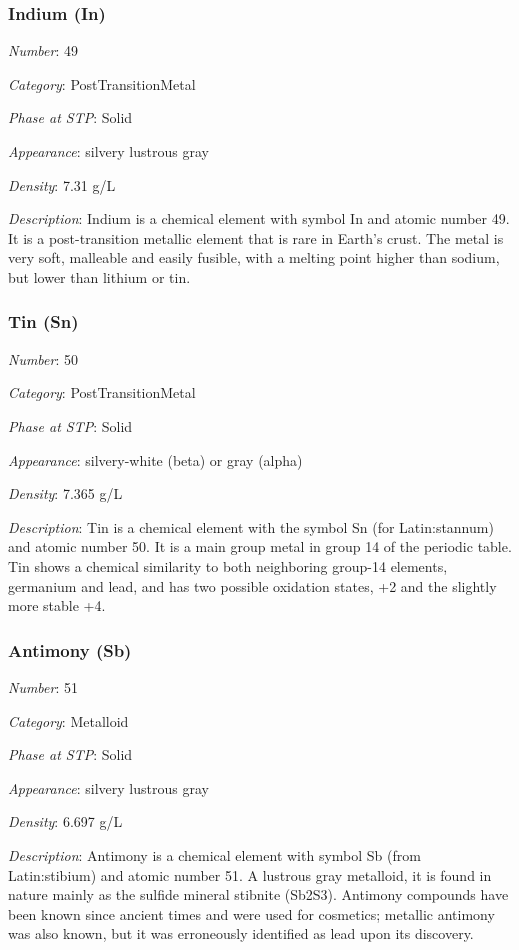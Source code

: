 \documentclass{article}
\begin{document}
\hypertarget{subsubsection::In}{}\subsubsection{Indium (In)}

\textit{Number}: 49

\textit{Category}: PostTransitionMetal

\textit{Phase at STP}: Solid

\textit{Appearance}: silvery lustrous gray

\textit{Density}: 7.31 g/L

\textit{Description}: Indium is a chemical element with symbol In and atomic number 49. It is a post-transition metallic element that is rare in Earth's crust. The metal is very soft, malleable and easily fusible, with a melting point higher than sodium, but lower than lithium or tin.

\hypertarget{subsubsection::Sn}{}\subsubsection{Tin (Sn)}

\textit{Number}: 50

\textit{Category}: PostTransitionMetal

\textit{Phase at STP}: Solid

\textit{Appearance}: silvery-white (beta) or gray (alpha)

\textit{Density}: 7.365 g/L

\textit{Description}: Tin is a chemical element with the symbol Sn (for Latin:stannum) and atomic number 50. It is a main group metal in group 14 of the periodic table. Tin shows a chemical similarity to both neighboring group-14 elements, germanium and lead, and has two possible oxidation states, +2 and the slightly more stable +4.

\hypertarget{subsubsection::Sb}{}\subsubsection{Antimony (Sb)}

\textit{Number}: 51

\textit{Category}: Metalloid

\textit{Phase at STP}: Solid

\textit{Appearance}: silvery lustrous gray

\textit{Density}: 6.697 g/L

\textit{Description}: Antimony is a chemical element with symbol Sb (from Latin:stibium) and atomic number 51. A lustrous gray metalloid, it is found in nature mainly as the sulfide mineral stibnite (Sb2S3). Antimony compounds have been known since ancient times and were used for cosmetics; metallic antimony was also known, but it was erroneously identified as lead upon its discovery.
\end{document}
